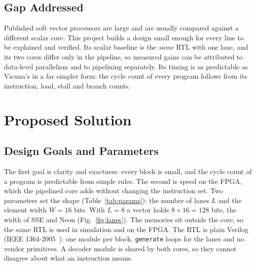 \subsection{Gap Addressed}
Published soft vector processors are large and are usually compared against a different
scalar core. This project builds a design small enough for every line to be explained
and verified. Its scalar baseline is the \emph{same} RTL with one lane, and its two cores
differ only in the pipeline, so measured gains can be attributed to data-level
parallelism and to pipelining separately. Its timing is as predictable as Vicuna's in a
far simpler form: the cycle count of every program follows from its instruction, load,
stall and branch counts.

\section{Proposed Solution}\label{sec:design}

\subsection{Design Goals and Parameters}
The first goal is clarity and exactness: every block is small, and the cycle count of a
program is predictable from simple rules. The second is speed on the FPGA, which the
pipelined core adds without changing the instruction set. Two parameters set the shape
(Table~\ref{tab:params}): the number of lanes $L$ and the element width $W = 16$ bits.
With $L = 8$ a vector holds $8 \times 16 = 128$ bits, the width of SSE and Neon
(Fig.~\ref{fig:lanes}). The memories sit outside the core, so the same RTL is used in
simulation and on the FPGA. The RTL is plain Verilog (IEEE
1364-2005~\cite{ieee1364}): one module per block, \texttt{generate} loops for the lanes
and no vendor primitives. A decoder module is shared by both cores, so they cannot
disagree about what an instruction means.

